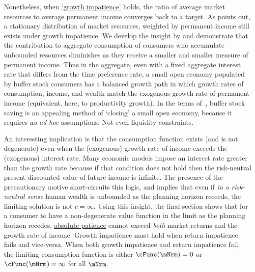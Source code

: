 \documentclass[BufferStockTheory]{subfiles}
\begin{document}
Nonetheless, when \hyperlink{GIC}{`growth impatience'} holds, the ratio of average market resources to average permanent income converges back to a target.
As \cite{harmenbergInvariant} points out, a stationary distribution of market resources, weighted by permanent income still exists under growth impatience.
We develop the insight by \cite{harmenbergInvariant} and demonstrate that the contribution to aggregate consumption of consumers who accumulate unbounded resources diminishes as they receive a smaller and smaller measure of permanent income.
Thus in the aggregate, even with a fixed aggregate interest rate that differs from the time preference rate, a small open economy populated by buffer stock consumers has a balanced growth path in which growth rates of consumption, income, and wealth match the exogenous growth rate of permanent income (equivalent, here, to productivity growth).
In the terms of~\cite{schmitt2003closing}, buffer stock saving is an appealing method of `closing' a small open economy, because it requires no \textit{ad-hoc} assumptions.
Not even liquidity constraints.

% 
% 
% 

An interesting implication is that the consumption function exists (and is not degenerate) even when the (exogenous) growth rate of income exceeds the (exogenous) interest rate.
Many economic models impose an interest rate greater than the growth rate because if that condition does not hold then the risk-neutral present discounted value of future income is infinite.
The presence of the precautionary motive short-circuits this logic, and implies that even if \textit{in a risk-neutral sense} human wealth is unbounded as the planning horizon receeds, the limiting solution is not $c = \infty$.
Using this insight, the final section shows that for a consumer to have a non-degenerate value function in the limit as the planning horizon recedes, \hyperlink{APF}{absolute patience} cannot exceed \textit{both} market returns and the growth rate of income.
Growth impatience must hold when return impatience fails and vice-versa.
When both growth impatience and return impatience fail, the limiting consumption function is either $\cFunc(\mNrm)=0$ or $\cFunc(\mNrm)=\infty$ for all $\mNrm$.
\end{document}
